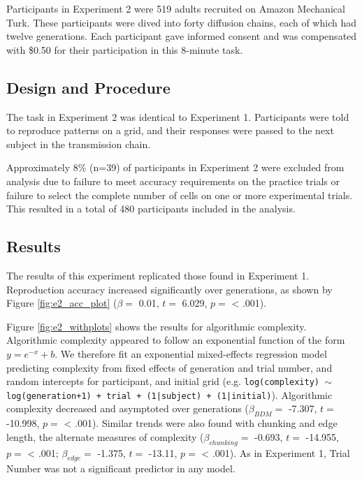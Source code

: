 \documentclass[10pt, letterpaper]{article}
\begin{document}
Participants in Experiment 2 were 519 adults recruited on Amazon
Mechanical Turk. These participants were dived into forty diffusion
chains, each of which had twelve generations. Each participant gave
informed consent and was compensated with \$0.50 for their participation
in this 8-minute task.

\hypertarget{design-and-procedure-1}{%
\subsection{Design and Procedure}\label{design-and-procedure-1}}

The task in Experiment 2 was identical to Experiment 1. Participants
were told to reproduce patterns on a grid, and their responses were
passed to the next subject in the transmission chain.

Approximately 8\% (n=39) of participants in Experiment 2 were excluded
from analysis due to failure to meet accuracy requirements on the
practice trials or failure to select the complete number of cells on one
or more experimental trials. This resulted in a total of 480
participants included in the analysis.

\hypertarget{results}{%
\subsection{Results}\label{results}}

The results of this experiment replicated those found in Experiment 1.
Reproduction accuracy increased significantly over generations, as shown
by Figure \ref{fig:e2_acc_plot} (\(\beta =\) 0.01, \(t =\) 6.029,
\(p =\) \textless{} .001).

Figure \ref{fig:e2_withplots} shows the results for algorithmic
complexity. Algorithmic complexity appeared to follow an exponential
function of the form \(y = e^{-x} + b\). We therefore fit an exponential
mixed-effects regression model predicting complexity from fixed effects
of generation and trial number, and random intercepts for participant,
and initial grid (e.g.
\texttt{log(complexity) $\sim$ log(generation+1) + trial + (1|subject) + (1|initial)}).
Algorithmic complexity decreased and asymptoted over generations
(\(\beta_{BDM} =\) -7.307, \(t =\) -10.998, \(p =\) \textless{} .001).
Similar trends were also found with chunking and edge length, the
alternate measures of complexity (\(\beta_{chunking} =\) -0.693, \(t =\)
-14.955, \(p =\) \textless{} .001; \(\beta_{edge} =\) -1.375, \(t =\)
-13.11, \(p =\) \textless{} .001). As in Experiment 1, Trial Number was
not a significant predictor in any model.
\end{document}
